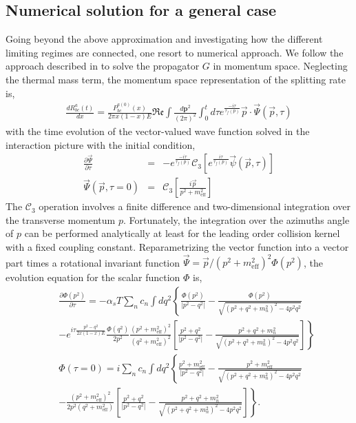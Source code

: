 \subsection{Numerical solution for a general case}
Going beyond the above approximation and investigating how the different limiting regimes are connected, one resort to numerical approach.
We follow the approach described in \cite{CaronHuot:2010bp} to solve the propagator $G$ in momentum space.
Neglecting the thermal mass term, the momentum space representation of the splitting rate is,
\begin{eqnarray}
\frac{dR^{a}_{bc}(t)}{dx} = \frac{P^{a(0)}_{bc}(x)}{2\pi x(1-x)E} \mathfrak{Re} \int \frac{d\mathbf{p}^2}{(2\pi)^2} \int_0^t d\tau e^{\frac{-i\tau}{\tau_f(p)}} \vec{p}\cdot \vec{\Psi}(\vec{p}, \tau)
\end{eqnarray}
with the time evolution of the vector-valued wave function solved in the interaction picture with the initial condition,
\begin{eqnarray}
\frac{\partial \vec{\Psi}}{\partial \tau} &=& - e^{\frac{-i\tau}{\tau_f(p)}} \mathcal{C}_3\left[e^{\frac{i\tau}{\tau_f(p)}}\vec{\psi}(\vec{p}, \tau)\right]\\
\vec{\Psi}(\vec{p}, \tau=0) &=& \mathcal{C}_3\left[\frac{i\vec{p}}{p^2+m^2_{\textrm{eff}}}\right]
\end{eqnarray}
The $\mathcal{C}_3$ operation involves a finite difference and two-dimensional integration over the transverse momentum $p$. 
Fortunately, the integration over the azimuths angle of $p$ can be performed analytically at least for the leading order collision kernel with a fixed coupling constant.
Reparametrizing the vector function into a vector part times a rotational invariant function $\vec{\Psi} = \vec{p}/(p^2+m^2_{\textrm{eff}})^2 \Phi(p^2)$, the evolution equation for the scalar function $\Phi$ is,
\begin{eqnarray}
&&\frac{\partial \Phi(p^2)}{\partial \tau} = - \alpha_s T \sum_n c_n \int dq^2 \left\{\frac{\Phi(p^2)}{|p^2-q^2|} - \frac{\Phi(p^2)}{\sqrt{(p^2+q^2+m_n^2)^2 - 4p^2q^2}}\right. \\\nonumber
&&\left.- e^{i\tau\frac{p^2-q^2}{2x(1-x)E}}\frac{\Phi(q^2)}{2p^2}\frac{(p^2+m^2_{\textrm{eff}})^2}{(q^2+m^2_{\textrm{eff}})^2} \left[\frac{p^2+q^2}{|p^2-q^2|} - \frac{p^2+q^2+m_n^2}{\sqrt{(p^2+q^2+m_n^2)^2 - 4p^2q^2}}\right]\right\}\\
&&\Phi(\tau=0)= i\sum_n c_n \int dq^2 \left\{\frac{p^2+m^2_{\textrm{eff}}}{|p^2-q^2|} - \frac{p^2+m^2_{\textrm{eff}}}{\sqrt{(p^2+q^2+m_n^2)^2 - 4p^2q^2}}\right. \\\nonumber
&&\left.-\frac{(p^2+m^2_{\textrm{eff}})^2}{2p^2(q^2+m^2_{\textrm{eff}})} \left[\frac{p^2+q^2}{|p^2-q^2|} - \frac{p^2+q^2+m_n^2}{\sqrt{(p^2+q^2+m_n^2)^2 - 4p^2q^2}}\right]\right\}.
\end{eqnarray}
